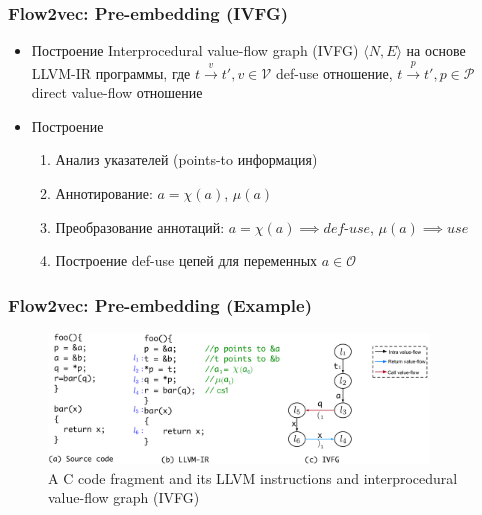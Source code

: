 \documentclass[xcolor=table,english]{beamer}
\begin{document}
\begin{frame}[fragile] \frametitle{Flow2vec: Pre-embedding (IVFG)}
    \begin{itemize}
        \item Построение  Interprocedural value-flow graph (IVFG) $\langle N, E \rangle$ на основе LLVM-IR программы, где $t \xrightarrow{v} t', v \in \mathcal{V}$ def-use отношение, $t \xrightarrow{p} t', p \in \mathcal{P}$ direct value-flow отношение
        \item Построение
        {
        \begin{enumerate}
            \item Анализ указателей (points-to информация)
            \item Аннотирование: $a = \chi(a)$, $\mu(a)$
            \item Преобразование аннотаций: $a = \chi(a) \implies \textit{def-use}$, $\mu(a) \implies \textit{use}$
            \item Построение def-use цепей для переменных $a \in \mathcal{O}$
        \end{enumerate}
        }
    \end{itemize}
\end{frame}

\begin{frame}[fragile] \frametitle{Flow2vec: Pre-embedding (Example)}
    \begin{minipage}[m]{\linewidth}
        \begin{figure}
            \centering
            \includegraphics[width=0.9\textwidth]{figures/llvm_ir_and_ivfg.png}
            \caption{A C code fragment and its LLVM instructions and interprocedural value-flow graph (IVFG)}
        \end{figure}
    \end{minipage}\hfill
\end{frame}
\end{document}
